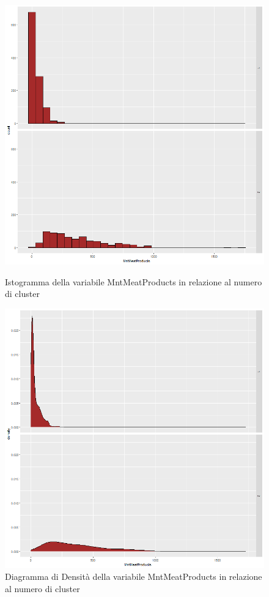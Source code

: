 \documentclass[letterpaper,11pt]{article}
\begin{document}
\begin{figure}[!htb]
   \begin{minipage}{0.48\textwidth}
     \centering
         \includegraphics[width=1\textwidth]{Img/K-MEANS/KMEANS019.png}
    \caption{Istogramma della variabile MntMeatProducts in relazione al numero di cluster}
    \label{fig:MntMeatProductsKmeansHistogram}
   \end{minipage}\hfill
   \begin{minipage}{0.48\textwidth}
     \centering
     \includegraphics[width=1\linewidth]{Img/K-MEANS/KMEANS020.png}
     \caption{Diagramma di Densità della variabile MntMeatProducts in relazione al numero di cluster}\label{fig:MntMeatProductsKmeansDensity}
   \end{minipage}
\end{figure}
\end{document}
